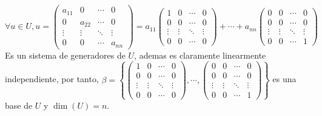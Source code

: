 \begin{ejercicio}
\begin{itemize}
			\begin{equation*}
				\forall u \in U, u = \begin{pmatrix}
					a_{11} & 0      & \cdots & 0      \\
					0      & a_{22} & \cdots & 0      \\
					\vdots & \vdots & \ddots & \vdots \\
					0      & 0      & \cdots & a_{nn}
				\end{pmatrix} = a_{11} \begin{pmatrix}
					1      & 0      & \cdots & 0      \\
					0      & 0      & \cdots & 0      \\
					\vdots & \vdots & \ddots & \vdots \\
					0      & 0      & \cdots & 0
				\end{pmatrix} +
				\cdots + a_{nn} \begin{pmatrix}
					0      & 0      & \cdots & 0      \\
					0      & 0      & \cdots & 0      \\
					\vdots & \vdots & \ddots & \vdots \\
					0      & 0      & \cdots & 1
				\end{pmatrix}
			\end{equation*}
			Es un sistema de generadores de $U$, ademas es claramente linearmente independiente, por tanto, $\beta = \left\{ \begin{pmatrix}
					1      & 0      & \cdots & 0      \\
					0      & 0      & \cdots & 0      \\
					\vdots & \vdots & \ddots & \vdots \\
					0      & 0      & \cdots & 0
				\end{pmatrix}, \cdots, \begin{pmatrix}
					0      & 0      & \cdots & 0      \\
					0      & 0      & \cdots & 0      \\
					\vdots & \vdots & \ddots & \vdots \\
					0      & 0      & \cdots & 1
				\end{pmatrix} \right\}$ es una base de $U$ y $\dim(U) = n$.
	\end{itemize}
\end{ejercicio}



